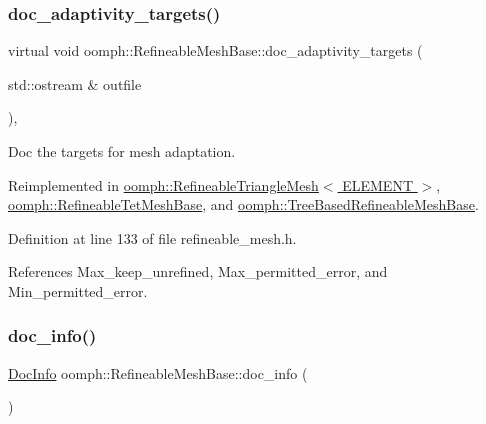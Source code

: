 \subsubsection{\texorpdfstring{doc\+\_\+adaptivity\+\_\+targets()}{doc\_adaptivity\_targets()}}
{\footnotesize\ttfamily virtual void oomph\+::\+Refineable\+Mesh\+Base\+::doc\+\_\+adaptivity\+\_\+targets (\begin{DoxyParamCaption}\item[{std\+::ostream \&}]{outfile }\end{DoxyParamCaption})\hspace{0.3cm}{\ttfamily [inline]}, {\ttfamily [virtual]}}



Doc the targets for mesh adaptation. 



Reimplemented in \hyperlink{classoomph_1_1RefineableTriangleMesh_a8b04c27cba8938936f73d90e00d70b22}{oomph\+::\+Refineable\+Triangle\+Mesh$<$ E\+L\+E\+M\+E\+N\+T $>$}, \hyperlink{classoomph_1_1RefineableTetMeshBase_a2e94ec6d2b35b8f84a38a165d9037908}{oomph\+::\+Refineable\+Tet\+Mesh\+Base}, and \hyperlink{classoomph_1_1TreeBasedRefineableMeshBase_a885171376e32cff058ab2fa4df6ca3c6}{oomph\+::\+Tree\+Based\+Refineable\+Mesh\+Base}.



Definition at line 133 of file refineable\+\_\+mesh.\+h.



References Max\+\_\+keep\+\_\+unrefined, Max\+\_\+permitted\+\_\+error, and Min\+\_\+permitted\+\_\+error.

\mbox{\label{classoomph_1_1RefineableMeshBase_a266f8b2a1499cc2ae7b24b19813923ee}} 
\subsubsection{\texorpdfstring{doc\+\_\+info()}{doc\_info()}}
{\footnotesize\ttfamily \hyperlink{classoomph_1_1DocInfo}{Doc\+Info} oomph\+::\+Refineable\+Mesh\+Base\+::doc\+\_\+info (\begin{DoxyParamCaption}{ }\end{DoxyParamCaption})\hspace{0.3cm}{\ttfamily [inline]}}



